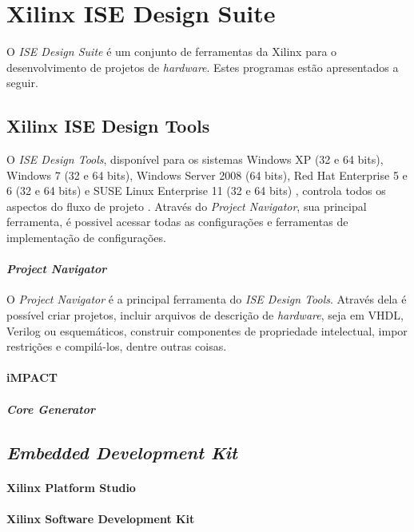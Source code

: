 \documentclass[11pt,a4paper,oneside]{book}
\begin{document}
\section{Xilinx ISE Design Suite}
O \textit{ISE Design Suite} é um conjunto de ferramentas da Xilinx para o desenvolvimento de projetos de \textit{hardware}.
Estes programas estão apresentados a seguir.

\subsection{Xilinx ISE Design Tools}
O \textit{ISE Design Tools}, disponível para os sistemas Windows XP (32 e 64 bits), Windows 7 (32 e 64 bits), Windows Server 2008 (64 bits), Red Hat Enterprise 5 e 6 (32 e 64 bits) e SUSE Linux Enterprise 11 (32 e 64 bits) \cite{ug631}, controla todos os aspectos do fluxo de projeto \cite{ug695}.
Através do \textit{Project Navigator}, sua principal ferramenta, é possivel acessar todas as configurações e ferramentas de implementação de configurações.

\paragraph{\textit{Project Navigator}} O \textit{Project Navigator} é a principal ferramenta do \textit{ISE Design Tools}.
Através dela é possível criar projetos, incluir arquivos de descrição de \textit{hardware}, seja em VHDL, Verilog ou esquemáticos, construir componentes de propriedade intelectual, impor restrições e compilá-los, dentre outras coisas.

\paragraph{iMPACT}
\paragraph{\textit{Core Generator}}

\subsection{\textit{Embedded Development Kit}}
\paragraph{Xilinx Platform Studio}
\paragraph{Xilinx Software Development Kit}
\end{document}
